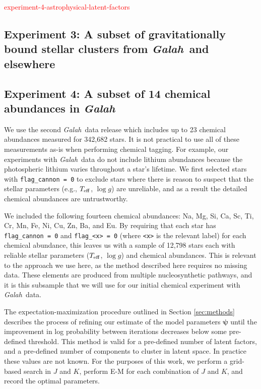 \documentclass[twocolumn]{aastex61}
\newcommand\teff{T_{\rm eff}}
\newcommand\logg{\log{g}}
\newcommand{\project}[1]{\textsl{#1}}
\newcommand{\Galah}{\project{Galah}}
\newcommand{\todo}[1]{\textcolor{red}{#1}}
\newcommand{\vect}[1]{\boldsymbol{\mathbf{#1}}}
\renewcommand{\vec}[1]{\vect{#1}}
\begin{document}
\todo{experiment-4-astrophysical-latent-factors}


\subsection{Experiment 3: A subset of gravitationally bound stellar clusters from \Galah\ and elsewhere}
\label{sec:experiment-galah-clusters}



\subsection{Experiment 4: A subset of 14 chemical abundances in \Galah}
\label{sec:experiment-galah}


We use the second \Galah\ data release \citep{Buder:2018a} which
includes up to 23 chemical abundances measured for 342,682
stars. It is not practical to use all of these measurements as-is
when performing chemical tagging. For example, our experiments
with \Galah\ data do not include lithium abundances because the
photospheric lithium varies throughout a star's lifetime. 
We first selected stars with \texttt{flag\_cannon = 0} to exclude
stars where there is reason to suspect that the stellar parameters
(e.g., $\teff$, $\logg$) are unreliable, and as a result the 
detailed chemical abundances are untrustworthy. 

We included the following fourteen chemical abundances: Na, Mg, 
Si, Ca, Sc, Ti, Cr, Mn, Fe, Ni, Cu, Zn, Ba, and Eu.
By requiring that each star has \texttt{flag\_cannon = 0} and
\texttt{flag\_<x> = 0} (where \texttt{<x>} is the relevant label)
for each chemical abundance, this leaves
us with a sample of 12,798 stars each with reliable stellar
parameters ($\teff$, $\logg$) and chemical abundances.
This is relevant to the approach we use here, as the method
described here requires no missing data.
These elements are produced from multiple nucleosynthetic
pathways, and it is this subsample that we will use for 
our initial chemical experiment with \Galah\ data.





The expectation-maximization procedure outlined in Section \ref{sec:methods} describes 
the process of refining our estimate of the model parameters $\vec\psi$ until
the improvement in log probability between iterations decreases below some
pre-defined threshold. This method is valid for a pre-defined number of latent
factors, and a pre-defined number of components to cluster in latent space.
In practice these values are not known. For the purposes of this work, we 
perform a grid-based search in $J$ and $K$, perform E-M for each combination of
$J$ and $K$, and record the optimal parameters.
\end{document}
